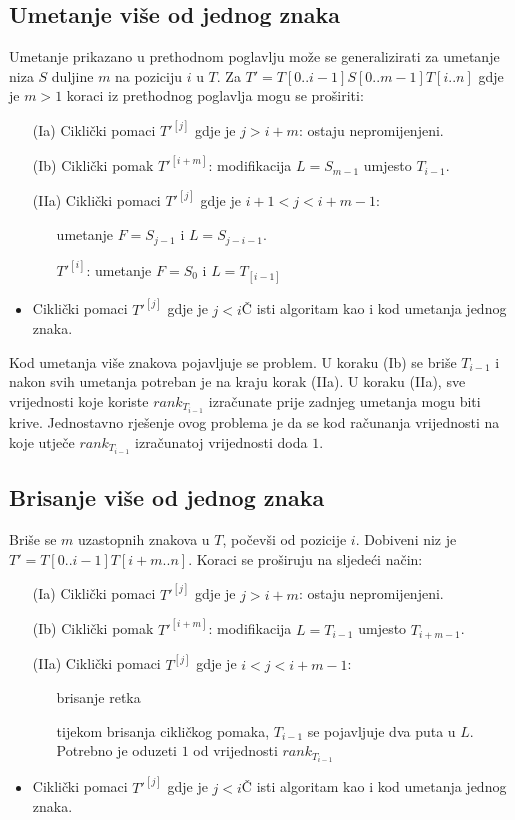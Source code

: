 \documentclass{ferseminar}
\begin{document}
\subsection{Umetanje više od jednog znaka}
Umetanje prikazano u prethodnom poglavlju može se generalizirati za umetanje niza $S$ duljine $m$ na poziciju $i$ u $T$. Za $T'=T[0..i-1]S[0..m-1]T[i..n]$ gdje je $m>1$ koraci iz prethodnog poglavlja mogu se proširiti:
\begin{itemize}
	\item[(Ia)] Ciklički pomaci $T'^{[j]}$ gdje je $j>i+m$: ostaju nepromijenjeni.
	\item[(Ib)] Ciklički pomak $T'^{[i+m]}$: modifikacija $L=S_{m-1}$ umjesto $T_{i-1}$.
	\item[(IIa)] Ciklički pomaci $T'^{[j]}$ gdje je $i+1<j<i+m-1$:
	\begin{itemize}
		\item[] umetanje $F=S_{j-1}$ i $L=S_{j-i-1}$.
		\item[$T'^{[i]}$:] umetanje  $F=S_0$ i $L=T_{[i-1]}$
	\end{itemize}
	\item Ciklički pomaci $T'^{[j]}$ gdje je $j<i$Č isti algoritam kao i kod umetanja jednog znaka.
\end{itemize}
Kod umetanja više znakova pojavljuje se problem. U koraku (Ib) se briše $T_{i-1}$ i nakon svih umetanja potreban je na kraju korak (IIa). U koraku (IIa), sve vrijednosti koje koriste $rank_{T_{i-1}}$ izračunate prije zadnjeg umetanja mogu biti krive. Jednostavno rješenje ovog problema je da se kod računanja vrijednosti na koje utječe $rank_{T_{i-1}}$ izračunatoj vrijednosti doda $1$.
\subsection{Brisanje više od jednog znaka}
Briše se $m$ uzastopnih znakova u $T$, počevši od pozicije $i$. Dobiveni niz je $T'=T[0..i-1]T[i+m..n]$. Koraci se proširuju na sljedeći način:
\begin{itemize}
	\item[(Ia)] Ciklički pomaci $T'^{[j]}$ gdje je $j>i+m$: ostaju nepromijenjeni.
	\item[(Ib)] Ciklički pomak $T'^{[i+m]}$: modifikacija $L=T_{i-1}$ umjesto $T_{i+m-1}$.
	\item[(IIa)] Ciklički pomaci $T^{[j]}$ gdje je $i<j<i+m-1$:
	\begin{itemize}
		\item[] brisanje retka
		\item[] tijekom brisanja cikličkog pomaka, $T_{i-1}$ se pojavljuje dva puta u $L$. Potrebno je oduzeti $1$ od vrijednosti $rank_{T_{i-1}}$
	\end{itemize}
	\item Ciklički pomaci $T'^{[j]}$ gdje je $j<i$Č isti algoritam kao i kod umetanja jednog znaka.
\end{itemize}
\end{document}
